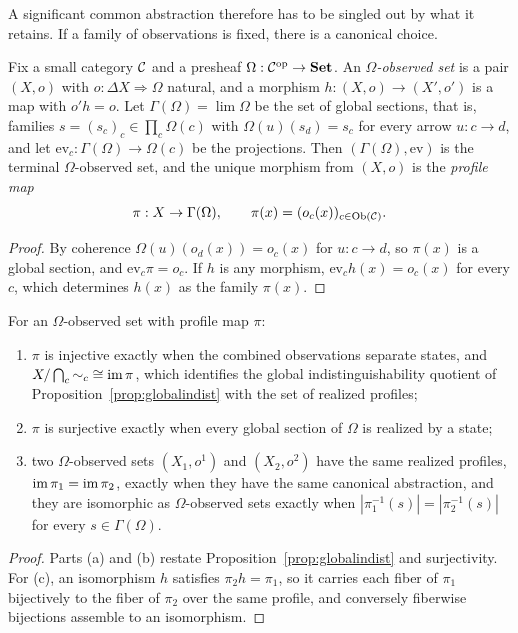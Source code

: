 A significant common abstraction therefore has to be singled out by what it retains. If a family of observations is fixed, there is a canonical choice.

\begin{theorem}\label{thm:terminalobs}
Fix a small category $\mathcal C$ and a presheaf $\Omega:\mathcal C^{\mathrm{op}}\to\mathbf{Set}$. An \emph{$\Omega$-observed set} is a pair $(X,o)$ with $o:\Delta X\Rightarrow\Omega$ natural, and a morphism $h:(X,o)\to(X',o')$ is a map with $o'h=o$. Let $\Gamma(\Omega)=\lim\Omega$ be the set of global sections, that is, families $s=(s_c)_c\in\prod_c\Omega(c)$ with $\Omega(u)(s_d)=s_c$ for every arrow $u:c\to d$, and let $\mathrm{ev}_c:\Gamma(\Omega)\to\Omega(c)$ be the projections. Then $(\Gamma(\Omega),\mathrm{ev})$ is the terminal $\Omega$-observed set, and the unique morphism from $(X,o)$ is the \emph{profile map}
\[
\pi:X\to\Gamma(\Omega),\qquad\pi(x)=(o_c(x))_{c\in\mathrm{Ob}(\mathcal C)}.
\]
\end{theorem}
\begin{proof}
By coherence $\Omega(u)(o_d(x))=o_c(x)$ for $u:c\to d$, so $\pi(x)$ is a global section, and $\mathrm{ev}_c\pi=o_c$. If $h$ is any morphism, $\mathrm{ev}_ch(x)=o_c(x)$ for every $c$, which determines $h(x)$ as the family $\pi(x)$.
\end{proof}

\begin{corollary}\label{cor:retains}
For an $\Omega$-observed set with profile map $\pi$:
\begin{enumerate}[label=(\alph*)]
\item $\pi$ is injective exactly when the combined observations separate states, and $X/\bigcap_c{\sim_c}\cong\operatorname{im}\pi$, which identifies the global indistinguishability quotient of Proposition~\ref{prop:globalindist} with the set of realized profiles;
\item $\pi$ is surjective exactly when every global section of $\Omega$ is realized by a state;
\item two $\Omega$-observed sets $(X_1,o^1)$ and $(X_2,o^2)$ have the same realized profiles, $\operatorname{im}\pi_1=\operatorname{im}\pi_2$, exactly when they have the same canonical abstraction, and they are isomorphic as $\Omega$-observed sets exactly when $|\pi_1^{-1}(s)|=|\pi_2^{-1}(s)|$ for every $s\in\Gamma(\Omega)$.
\end{enumerate}
\end{corollary}
\begin{proof}
Parts (a) and (b) restate Proposition~\ref{prop:globalindist} and surjectivity. For (c), an isomorphism $h$ satisfies $\pi_2h=\pi_1$, so it carries each fiber of $\pi_1$ bijectively to the fiber of $\pi_2$ over the same profile, and conversely fiberwise bijections assemble to an isomorphism.
\end{proof}


